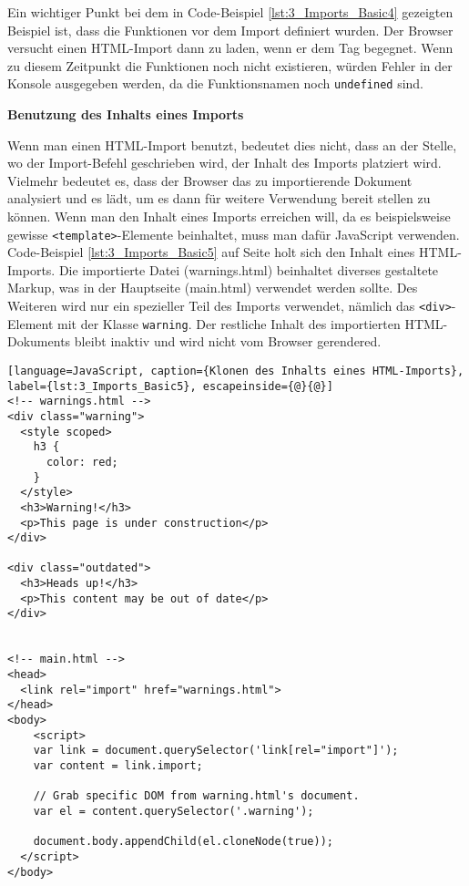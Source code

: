 Ein wichtiger Punkt bei dem in Code-Beispiel \ref{lst:3_Imports_Basic4} gezeigten Beispiel ist, dass die Funktionen vor dem Import definiert wurden. Der Browser versucht einen HTML-Import dann zu laden, wenn er dem Tag begegnet. Wenn zu diesem Zeitpunkt die Funktionen noch nicht existieren, würden Fehler in der Konsole ausgegeben werden, da die Funktionsnamen noch \lstinline|undefined| sind.

\textbf{Benutzung des Inhalts eines Imports}

Wenn man einen HTML-Import benutzt, bedeutet dies nicht, dass an der Stelle, wo der Import-Befehl geschrieben  wird, der Inhalt des Imports platziert wird. Vielmehr bedeutet es, dass der Browser das zu importierende Dokument analysiert und es lädt, um es dann für weitere Verwendung bereit stellen zu können. Wenn man den Inhalt eines Imports erreichen will, da es beispielsweise gewisse \lstinline|<template>|-Elemente beinhaltet, muss man dafür JavaScript verwenden. Code-Beispiel \ref{lst:3_Imports_Basic5} auf Seite \pageref{lst:3_Imports_Basic5} holt sich den Inhalt eines HTML-Imports. Die importierte Datei (warnings.html) beinhaltet diverses gestaltete Markup, was in der Hauptseite (main.html) verwendet werden sollte. Des Weiteren wird nur ein spezieller Teil des Imports verwendet, nämlich das \lstinline|<div>|-Element mit der Klasse \lstinline|warning|. Der restliche Inhalt des importierten HTML-Dokuments bleibt inaktiv und wird nicht vom Browser gerendered.

\begin{lstlisting}[language=JavaScript, caption={Klonen des Inhalts eines HTML-Imports}, label={lst:3_Imports_Basic5}, escapeinside={@}{@}]
<!-- warnings.html -->
<div class="warning">
  <style scoped>
    h3 {
      color: red;
    }
  </style>
  <h3>Warning!</h3>
  <p>This page is under construction</p>
</div>

<div class="outdated">
  <h3>Heads up!</h3>
  <p>This content may be out of date</p>
</div>


<!-- main.html -->
<head>
  <link rel="import" href="warnings.html">
</head>
<body>
    <script>
    var link = document.querySelector('link[rel="import"]');
    var content = link.import;

    // Grab specific DOM from warning.html's document.
    var el = content.querySelector('.warning');

    document.body.appendChild(el.cloneNode(true));
  </script>
</body>
\end{lstlisting}

